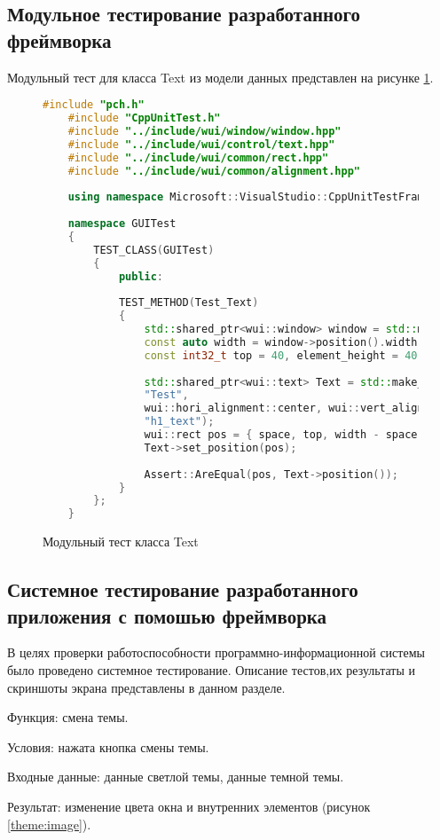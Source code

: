 \subsection{Модульное тестирование разработанного фреймворка}

Модульный тест для класса Text из модели данных представлен на рисунке \ref{classText:image}.

\begin{figure}[ht]
\begin{lstlisting}[language=C++]
	#include "pch.h"
	#include "CppUnitTest.h"
	#include "../include/wui/window/window.hpp"
	#include "../include/wui/control/text.hpp"
	#include "../include/wui/common/rect.hpp"
	#include "../include/wui/common/alignment.hpp"
	
	using namespace Microsoft::VisualStudio::CppUnitTestFramework;
	
	namespace GUITest
	{
		TEST_CLASS(GUITest)
		{
			public:
			
			TEST_METHOD(Test_Text)
			{
				std::shared_ptr<wui::window> window = std::make_shared<wui::window>();
				const auto width = window->position().width(), height = window->position().height();
				const int32_t top = 40, element_height = 40, space = 30;
				
				std::shared_ptr<wui::text> Text = std::make_shared<wui::text>(
				"Test",
				wui::hori_alignment::center, wui::vert_alignment::center,
				"h1_text");
				wui::rect pos = { space, top, width - space, top + element_height };
				Text->set_position(pos);
				
				Assert::AreEqual(pos, Text->position());
			}
		};
	}
\end{lstlisting}  
\caption{Модульный тест класса Text}
\label{classText:image}
\end{figure}

\subsection{Системное тестирование разработанного приложения с помошью фреймворка}
В целях проверки работоспособности программно-информационной системы было проведено системное тестирование. Описание тестов,их результаты и скриншоты экрана представлены в данном разделе.

Функция: смена темы.

Условия: нажата кнопка смены темы.

Входные данные: данные светлой темы, данные темной темы.

Результат: изменение цвета окна и внутренних элементов (рисунок \ref{theme:image}).

